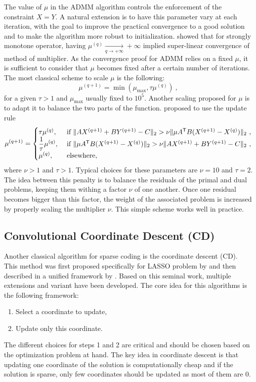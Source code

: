 \documentclass[../thesis.tex]{subfiles}
\begin{document}
	
	The value of $\mu$ in the ADMM algorithm controls the enforcement of the constraint
	$X = Y$. A natural extension is to have this parameter vary at each iteration, with
	the goal to improve the practical convergence to a good solution and to make the
	algorithm more robust to initialization. \citet{Rockafellar1976} showed that for
	strongly monotone operator, having $\mu^{(q)} \xrightarrow[q\to+\infty]{}+\infty$
	implied super-linear convergence of method of multiplier. As the convergence
	proof for ADMM relies on a fixed $\mu$, it is sufficient to consider that $\mu$
	becomes fixed after a certain number of iterations. The most classical scheme to
	scale $\mu$ is the following:
	\[
		\mu^{(q+1)} = \min(\mu_{\max}, \tau\mu^{(q)})~,
	\]
	for a given $\tau > 1$ and $\mu_{\max}$ usually fixed to $10^5$. Another scaling
	proposed for $\mu$ is to adapt it to balance the two parts of the function.
	\citet{He2000} proposed to use the update rule
	\[
		\mu^{(q+1)} = \begin{cases}
			\tau \mu^{(q)}, &\text{ if } \|AX^{(q+1)} + BY^{(q+1)} - C\|_2 >
											\nu \|\mu A^\mathsf{T} B (X^{(q+1)} - X^{(q)})\|_2~,\\
			\displaystyle \frac{1}{\tau}\mu^{(q)}, &\text{ if }  \|\mu A^\mathsf{T} B (X^{(q+1)} - X^{(q)})\|_2 >
											\nu \|AX^{(q+1)} + BY^{(q+1)} - C\|_2~,\\
			\mu^{(q)}, &\text{ elsewhere,}\\
	
		\end{cases}
	\]
	where $\nu > 1$ and $\tau > 1$. Typical choices for these parameters are $\nu = 10$
	and $\tau = 2$. The idea between this penalty is to balance the residuals of the primal
	and dual problems, keeping them withing a factor $\nu$ of one another. Once one residual
	becomes	bigger than this factor, the weight of the associated problem is increased by
	properly scaling the multiplier $\nu$. This simple scheme works well in practice. 



\subsection{Convolutional Coordinate Descent (CD)}
\label{sub:cd}

	Another classical algorithm for sparse coding is the coordinate descent (CD).
	This method was first proposed specifically for LASSO problem by \citet{Wang2007}
	and then described in a unified framework by \citet{Friedman2007}. Based on this
	seminal work, multiple extensions and variant have been developed. The core idea
	for this algorithms is the following framework:
	\begin{enumerate}
		\item Select a coordinate to update,
		\item Update only this coordinate.
	\end{enumerate}
	The different choices for steps 1 and 2 are critical and should be chosen based
	on the optimization problem at hand. The key idea in coordinate descent is that
	updating one coordinate of the solution is computationally cheap and if the solution
	is sparse, only few coordinates should be updated as most of them are $0$.
\end{document}
